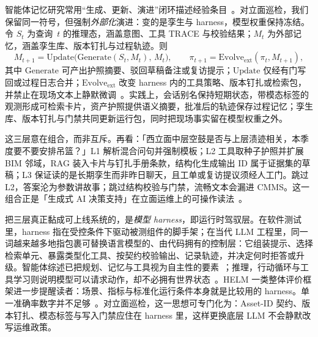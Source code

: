 智能体记忆研究常用``生成、更新、演进''闭环描述经验条目~\cite{park2023generativeagents,yao2023react,wang2024surveyagents}。对立面巡检，我们保留同一符号，但强制\emph{外部化}演进：变的是孪生与 harness，模型权重保持冻结。令 $S_t$ 为查询~$t$ 的推理态，涵盖意图、工具 TRACE 与校验结果；$M_t$ 为外部记忆，涵盖孪生库、版本钉扎与过程轨迹。则
\begin{equation}
\label{eq:ch8-mem-loop}
M_{t+1}=\mathrm{Update}\!\bigl(\mathrm{Generate}(S_t,M_t),\,M_t\bigr),\qquad
\pi_{t+1}=\mathrm{Evolve}_{\mathrm{ext}}(\pi_t,M_{t+1}),
\end{equation}
其中 $\mathrm{Generate}$ 可产出护照摘要、驳回草稿备注或复访提示；$\mathrm{Update}$ 仅经有门写回或过程日志合并；$\mathrm{Evolve}_{\mathrm{ext}}$ 改变 harness 内的工具策略、版本钉扎或检索包，并禁止在现场文本上静默微调~\cite{lewis2020,luo2025llmdtrobot,gao2026ifcagent}。实践上，会话别名保持短期状态，带模态标签的观测形成可检索卡片，资产护照提供语义摘要，批准后的轨迹保存过程记忆；孪生库、版本钉扎与门禁共同更新运行包，同时把现场事实留在模型权重之外。

这三层意在组合，而非互斥。再看：「西立面中层空鼓是否与上层渍迹相关，本季度要不要安排吊篮？」L1 解析混合问句并强制模板；L2 工具取种子护照并扩展 BIM 邻域，RAG 装入卡片与钉扎手册条款，结构化生成输出 ID 属于证据集的草稿；L3 保证读的是长期孪生而非昨日聊天，且工单或复访提议须经人工门。跳过 L2，答案沦为参数讲故事；跳过结构校验与门禁，流畅文本会漏进 CMMS。这一组合正是「生成式 AI 决策支持」在立面运维上的可操作读法~\cite{lewis2020,yao2023react,ji2023}。

把三层真正黏成可上线系统的，是\emph{模型 harness}，即运行时驾驭层。在软件测试里，harness 指在受控条件下驱动被测组件的脚手架；在当代 LLM 工程里，同一词越来越多地指包裹可替换语言模型的、由代码拥有的控制层：它组装提示、选择检索单元、暴露类型化工具、按契约校验输出、记录轨迹，并决定何时拒答或升级。智能体综述已把规划、记忆与工具视为自主性的要素~\cite{wang2024surveyagents,li2024surveymultiagent}；推理，行动循环与工具学习则说明模型可以请求动作，却不必拥有世界状态~\cite{yao2023react,schick2023toolformer}。HELM 一类整体评价框架进一步提醒读者：场景、指标与标准化运行条件本身就是比较用的 harness。单一准确率数字并不足够~\cite{liang2023helm}。对立面巡检，这一思想可专门化为：Asset-ID 契约、版本钉扎、模态标签与写入门禁应住在 harness 里，这样更换底层 LLM 不会静默改写运维政策。

